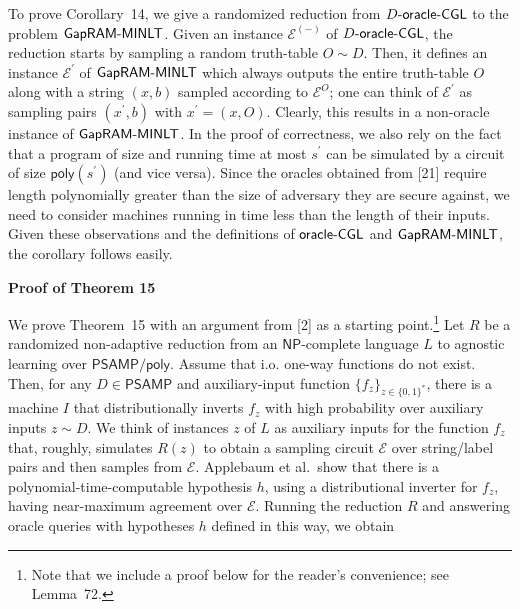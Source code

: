 To prove Corollary 14, we give a randomized reduction from $D\text{-}{\sf oracle}\text{-}{\sf CGL}$ to the problem ${\sf Gap}{\sf RAM}\text{-}{\sf MINLT}$. Given an instance $\mathcal{E}^{(-)}$ of $D\text{-}{\sf oracle}\text{-}{\sf CGL}$, the reduction starts by sampling a random truth-table $O\sim D$. Then, it defines an instance $\mathcal{E}^{\prime}$ of ${\sf Gap}{\sf RAM}\text{-}{\sf MINLT}$ which always outputs the entire truth-table $O$ along with a string $(x,b)$ sampled according to $\mathcal{E}^{O}$; one can think of $\mathcal{E}^{\prime}$ as sampling pairs $(x^{\prime},b)$ with $x^{\prime}=(x,O)$. Clearly, this results in a non-oracle instance of ${\sf Gap}{\sf RAM}\text{-}{\sf MINLT}$. In the proof of correctness, we also rely on the fact that a program of size and running time at most $s^{\prime}$ can be simulated by a circuit of size ${\mathsf{poly}}(s^{\prime})$ (and vice versa). Since the oracles obtained from [21] require length polynomially greater than the size of adversary they are secure against, we need to consider machines running in time less than the length of their inputs. Given these observations and the definitions of ${\sf oracle}\text{-}{\sf CGL}$ and ${\sf Gap}{\sf RAM}\text{-}{\sf MINLT}$, the corollary follows easily.\par





\par\medskip\noindent\textbf{Proof of Theorem 15
}\par




We prove Theorem 15 with an argument from [2] as a starting point.\footnote{Note that we include a proof below for the reader’s convenience; see Lemma 72.} Let $R$ be a randomized non-adaptive reduction from an ${\mathsf{NP}}$-complete language $L$ to agnostic learning over ${\mathsf{P}}{\mathsf{SAMP}}/{\mathsf{poly}}$. Assume that i.o. one-way functions do not exist. Then, for any $D\in{\mathsf{P}}{\mathsf{SAMP}}$ and auxiliary-input function $\{f_{z}\}_{z\in\{0,1\}^{*}}$, there is a machine $I$ that distributionally inverts $f_{z}$ with high probability over auxiliary inputs $z\sim D$. We think of instances $z$ of $L$ as auxiliary inputs for the function $f_{z}$ that, roughly, simulates $R(z)$ to obtain a sampling circuit $\mathcal{E}$ over string/label pairs and then samples from $\mathcal{E}$. Applebaum et al. show that there is a polynomial-time-computable hypothesis $h$, using a distributional inverter for $f_{z}$, having near-maximum agreement over $\mathcal{E}$. Running the reduction $R$ and answering oracle queries with hypotheses $h$ defined in this way, we obtain\par


